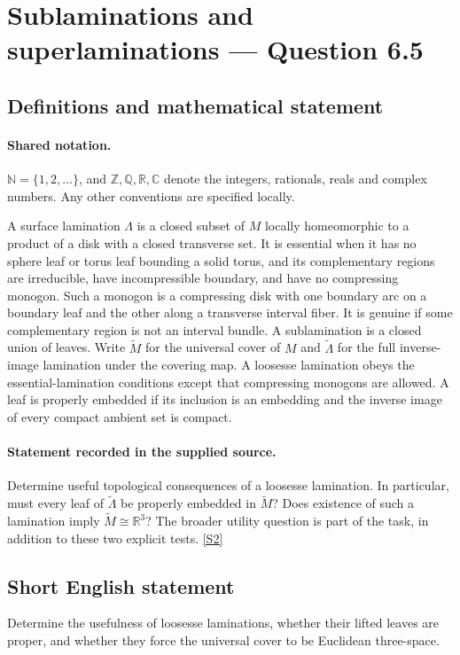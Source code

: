 \documentclass[11pt]{article}
\newcommand{\sref}[2]{\hyperlink{source:#1:#2}{[S#2]}}
\begin{document}
\section{Sublaminations and superlaminations — Question 6.5}\label{statement}

\subsection{Definitions and mathematical statement}

\paragraph{Shared notation.}$\mathbb N=\{1,2,\ldots\}$, and $\mathbb Z,\mathbb Q,\mathbb R,\mathbb C$ denote the integers, rationals, reals and complex numbers. Any other conventions are specified locally.


A surface lamination $\Lambda$ is a closed subset of $M$ locally homeomorphic to a product of a disk with a closed transverse set. It is essential when it has no sphere leaf or torus leaf bounding a solid torus, and its complementary regions are irreducible, have incompressible boundary, and have no compressing monogon. Such a monogon is a compressing disk with one boundary arc on a boundary leaf and the other along a transverse interval fiber. It is genuine if some complementary region is not an interval bundle. A sublamination is a closed union of leaves. Write $\widetilde M$ for the universal cover of $M$ and $\widetilde\Lambda$ for the full inverse-image lamination under the covering map. A loosesse lamination obeys the essential-lamination conditions except that compressing monogons are allowed. A leaf is properly embedded if its inclusion is an embedding and the inverse image of every compact ambient set is compact.
\paragraph{Statement recorded in the supplied source.}
Determine useful topological consequences of a loosesse lamination. In particular, must every leaf of $\widetilde\Lambda$ be properly embedded in $\widetilde M$? Does existence of such a lamination imply $\widetilde M\cong\mathbb R^3$? The broader utility question is part of the task, in addition to these two explicit tests. \sref{statement}{2}
\subsection{Short English statement}
Determine the usefulness of loosesse laminations, whether their lifted leaves are proper, and whether they force the universal cover to be Euclidean three-space.
\end{document}
